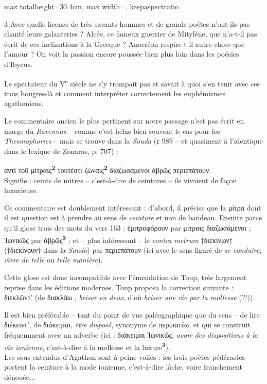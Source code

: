 \documentclass[11pt,twoside]{book}
\newcommand{\italique}[1]{\textit{#1}}
\newcommand{\citComm}[1]{\begin{quoting}[vskip=0.4pt,leftmargin=0.7em,rightmargin=0.2em]#1\end{quoting}}
\newcommand{\nieme}[1]{#1\textsuperscript{e}}
\newcommand{\francais}[1]{{\policeFr #1}}
\newlength{\larg}
\newcommand{\marqueur}[1]{\textsuperscript{\color{rubricRed}\textbf{#1}}}
\begin{document}
\begin{adjustbox}{max totalheight=30.4cm, max width=\textwidth, keepaspectratio}
\begin{minipage}{\textwidth}
{\begin{multicols}{3}
{\francais{Avec quelle licence de très savants hommes et de grands poètes n'ont-ils pas chanté leurs galanteries ? Alcée, ce fameux guerrier de Mitylène, que n'a-t-il pas écrit de ces inclinations à la Grecque ? Anacréon respire-t-il autre chose que l'amour ? On voit la passion encore poussée bien plus loin dans les poésies d'Ibycus.}}
\par\vspace{1.5pt}
\noindent Le spectateur du \nieme{V} siècle ne s'y trompait pas et savait à quoi s'en tenir avec ces trois bougres-là et comment interpréter correctement les euphémismes agathoniens.
\par\vspace{1.5pt}
\noindent Le commentaire ancien le plus pertinent sur notre passage n'est pas écrit en marge du \italique{Ravennas} -- comme c'est hélas bien souvent le cas pour les \italique{Thesmophories} -- mais se trouve dans la \italique{Souda} (ε 989 -- et quasiment à l'identique dans le lexique de Zonaras, p. 707) :
\citComm{ἀντὶ τοῦ μίτραις\marqueur{2} τουτέστι ζώναις\marqueur{2} διαζωσάμενοι ἁβρῶς περιεπάτουν.\\
Signifie : ceints de mitres -- c'est-à-dire de ceintures -- ils vivaient de façon luxurieuse.}
\par\vspace{1.5pt}
\noindent Ce commentaire est doublement intéressant : d'abord, il précise que la μίτρα dont il est question est à prendre au sens de \italique{ceinture} et non de bandeau. Ensuite parce qu'il glose trois des mots du vers 163 : ἐμιτροφόρουν par μίτραις διαζωσάμενοι ; Ἰωνικῶς par ἁβρῶς\marqueur{3} ; et -- plus intéressant -- le \italique{contra metrum} †διεκίνων† (†διεκίνουν† dans la \italique{Souda}) par περιεπάτουν (ici avec le sens figuré de \italique{se conduire}, \italique{vivre de telle} ou \italique{telle manière}).
\par\vspace{1.5pt}
\noindent Cette glose est donc incompatible avec l'émendation de Toup, très largement reprise dans les éditions modernes. Toup proposa la correction suivante : διεκλῶντ' (de διακλάω , \italique{briser en deux}, d'où \italique{briser une vie par la mollesse} (?!)).
\par\vspace{1.5pt}
\noindent Il est bien préférable -- tant du point de vue paléographique que du sens -- de lire διέκειντ', de διάκειμαι, \italique{être disposé}, synonyme de περιπατέω, et qui se construit fréquemment avec un adverbe (ici : διάκειμαι Ἰωνικῶς, \italique{avoir des dispositions à la vie ionienne}, c'est-à-dire à la mollesse et la luxure\marqueur{3}).\\ Les sous-entendus d'Agathon sont à peine voilés : les trois poètes pédérastes portent la ceinture à la mode ionienne, c'est-à-dire lâche, voire franchement dénouée...

\end{multicols}}
\end{minipage}
\end{adjustbox}
\end{document}
